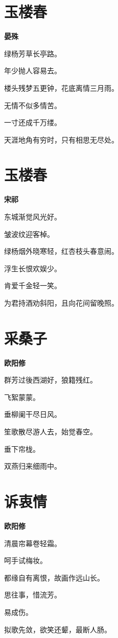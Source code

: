 \documentclass[12pt,a4paper]{ctexbook}
\begin{document}
\section{玉楼春}
\textbf{晏殊}\par\vspace{0.5em}
绿杨芳草长亭路。\par
年少抛人容易去。\par
楼头残梦五更钟，花底离情三月雨。\par
无情不似多情苦。\par
一寸还成千万缕。\par
天涯地角有穷时，只有相思无尽处。\par

\section{玉楼春}
\textbf{宋祁}\par\vspace{0.5em}
东城渐觉风光好。\par
皱波纹迎客棹。\par
绿杨烟外晓寒轻，红杏枝头春意闹。\par
浮生长恨欢娱少。\par
肯爱千金轻一笑。\par
为君持酒劝斜阳，且向花间留晚照。\par

\section{采桑子}
\textbf{欧阳修}\par\vspace{0.5em}
群芳过後西湖好，狼籍残红。\par
飞絮蒙蒙。\par
垂柳阑干尽日风。\par
笙歌散尽游人去，始觉春空。\par
垂下帘栊。\par
双燕归来细雨中。\par

\section{诉衷情}
\textbf{欧阳修}\par\vspace{0.5em}
清晨帘幕卷轻霜。\par
呵手试梅妆。\par
都缘自有离恨，故画作远山长。\par
思往事，惜流芳。\par
易成伤。\par
拟歌先敛，欲笑还颦，最断人肠。\par
\end{document}
